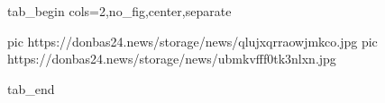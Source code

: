 
 
 
 
 

\ifcmt
  tab_begin cols=2,no_fig,center,separate

     pic https://donbas24.news/storage/news/qlujxqrraowjmkco.jpg
     pic https://donbas24.news/storage/news/ubmkvfff0tk3nlxn.jpg

  tab_end
\fi
